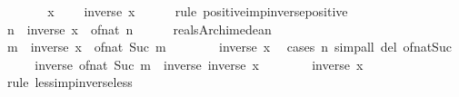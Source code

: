 \begin{isabellebody}
%
\isadelimproof
%
\endisadelimproof
%
\isatagproof
{}\isamarkupfalse%
\ {\isacharminus}{\kern0pt}\isanewline
\ \ \isamarkupfalse%
\ {\isacartoucheopen}{}\ {\isacharless}{\kern0pt}\ x{\isacartoucheclose}\ \isamarkupfalse%
\ {\isachardoublequoteopen}{}\ {\isacharless}{\kern0pt}\ inverse\ x{\isachardoublequoteclose}\isanewline
\ \ \ \ \isamarkupfalse%
\ {\isacharparenleft}{\kern0pt}rule\ positive{\isacharunderscore}{\kern0pt}imp{\isacharunderscore}{\kern0pt}inverse{\isacharunderscore}{\kern0pt}positive{\isacharparenright}{\kern0pt}\isanewline
\ \ \isamarkupfalse%
\ n\ \ {\isachardoublequoteopen}inverse\ x\ {\isacharless}{\kern0pt}\ of{\isacharunderscore}{\kern0pt}nat\ n{\isachardoublequoteclose}\isanewline
\ \ \ \ \isamarkupfalse%
\ reals{\isacharunderscore}{\kern0pt}Archimedean{}\ \isacommand{{\isachardot}{\kern0pt}{\isachardot}{\kern0pt}}\isamarkupfalse%
\isanewline
\ \ \isamarkupfalse%
\ \isamarkupfalse%
\ m\ \ {\isachardoublequoteopen}inverse\ x\ {\isacharless}{\kern0pt}\ of{\isacharunderscore}{\kern0pt}nat\ {\isacharparenleft}{\kern0pt}Suc\ m{\isacharparenright}{\kern0pt}{\isachardoublequoteclose}\isanewline
\ \ \ \ \isamarkupfalse%
\ {\isacartoucheopen}{}\ {\isacharless}{\kern0pt}\ inverse\ x{\isacartoucheclose}\ \isamarkupfalse%
\ {\isacharparenleft}{\kern0pt}cases\ n{\isacharparenright}{\kern0pt}\ {\isacharparenleft}{\kern0pt}simp{\isacharunderscore}{\kern0pt}all\ del{\isacharcolon}{\kern0pt}\ of{\isacharunderscore}{\kern0pt}nat{\isacharunderscore}{\kern0pt}Suc{\isacharparenright}{\kern0pt}\isanewline
\ \ \isamarkupfalse%
\ \isamarkupfalse%
\ {\isachardoublequoteopen}inverse\ {\isacharparenleft}{\kern0pt}of{\isacharunderscore}{\kern0pt}nat\ {\isacharparenleft}{\kern0pt}Suc\ m{\isacharparenright}{\kern0pt}{\isacharparenright}{\kern0pt}\ {\isacharless}{\kern0pt}\ inverse\ {\isacharparenleft}{\kern0pt}inverse\ x{\isacharparenright}{\kern0pt}{\isachardoublequoteclose}\isanewline
\ \ \ \ \isamarkupfalse%
\ {\isacartoucheopen}{}\ {\isacharless}{\kern0pt}\ inverse\ x{\isacartoucheclose}\ \isamarkupfalse%
\ {\isacharparenleft}{\kern0pt}rule\ less{\isacharunderscore}{\kern0pt}imp{\isacharunderscore}{\kern0pt}inverse{\isacharunderscore}{\kern0pt}less{\isacharparenright}{\kern0pt}\isanewline
\ \ \isamarkupfalse%
\ \isamarkupfalse%

\end{isabellebody}
